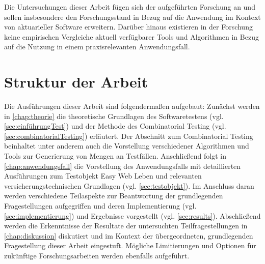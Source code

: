 Die Untersuchungen dieser Arbeit fügen sich der aufgeführten Forschung an und sollen insbesondere den Forschungsstand in Bezug auf die Anwendung im Kontext von aktuarieller Software erweitern. Darüber hinaus existieren in der Forschung keine empirischen Vergleiche aktuell verfügbarer Tools und Algorithmen in Bezug auf die Nutzung in einem praxisrelevanten Anwendungsfall.

\section{Struktur der Arbeit}\label{sec:strukturderArbeit}

Die Ausführungen dieser Arbeit sind folgendermaßen aufgebaut: Zunächst werden in \autoref{chap:theorie} die theoretische Grundlagen des Softwaretestens (vgl. \autoref{sec:einführungTest}) und der Methode des Combinatorial Testing (vgl. \autoref{sec:combinatorialTesting}) erläutert. Der Abschnitt zum Combinatorial Testing beinhaltet unter anderem auch die Vorstellung verschiedener Algorithmen und Tools zur Generierung von Mengen an Testfällen. Anschließend folgt in \autoref{chap:anwendungsfall} die Vorstellung des Anwendungsfalls mit detaillierten Ausführungen zum Testobjekt \glqq Easy Web Leben\grqq{} und relevanten versicherungstechnischen Grundlagen (vgl. \autoref{sec:testobjekt}). Im Anschluss daran werden verschiedene Teilaspekte zur Beantwortung der grundlegenden Fragestellungen aufgegriffen und deren Implementierung (vgl. \autoref{sec:implementierung}) und Ergebnisse vorgestellt (vgl. \autoref{sec:results}). Abschließend werden die Erkenntnisse der Resultate der untersuchten Teilfragestellungen in \autoref{chap:diskussion} diskutiert und im Kontext der übergeordneten, grundlegenden Fragestellung dieser Arbeit eingestuft. Mögliche Limitierungen und Optionen für zukünftige Forschungsarbeiten werden ebenfalls aufgeführt.

